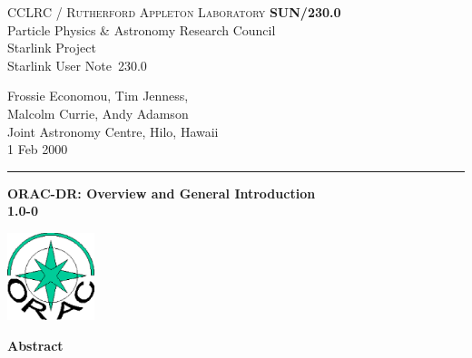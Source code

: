 \documentclass[twoside,11pt]{article}
\newcommand{\stardoccategory}  {Starlink User Note}
\newcommand{\stardocinitials}  {SUN}
\newcommand{\stardocnumber}    {230.0}
\newcommand{\stardocauthors}   {Frossie Economou, Tim Jenness,\\ Malcolm Currie, Andy Adamson\\
Joint Astronomy Centre, Hilo, Hawaii}
\newcommand{\stardocdate}      {1 Feb 2000}
\newcommand{\stardoctitle}     {ORAC-DR: Overview and General Introduction}
\newcommand{\stardocversion}   {1.0-0}
\newcommand{\stardocmanual}    {}
\newcommand{\stardocname}{\stardocinitials /\stardocnumber}
\newenvironment{latexonly}{}{}
\renewcommand{\_}{\texttt{\symbol{95}}}
\begin{document}
\thispagestyle{empty}

\begin{latexonly}
   CCLRC / \textsc{Rutherford Appleton Laboratory} \hfill \textbf{\stardocname}\\
   {\large Particle Physics \& Astronomy Research Council}\\
   {\large Starlink Project\\}
   {\large \stardoccategory\ \stardocnumber}
   \begin{flushright}
   \stardocauthors\\
   \stardocdate
   \end{flushright}
   \vspace{-4mm}
   \rule{\textwidth}{0.5mm}
   \vspace{5mm}
   \begin{center}
   {\Huge\textbf{\stardoctitle \\ [2.5ex]}}
   {\LARGE\textbf{\stardocversion \\ [4ex]}}
   {\Huge\textbf{\stardocmanual}}
   \end{center}
   \vspace{5mm}

\begin{center}
\includegraphics[width=1.0in]{sun230_logo.eps}
\end{center}

   \vspace{10mm}
   \begin{center}
      {\Large\textbf{Abstract}}
   \end{center}
\end{latexonly}
\end{document}
